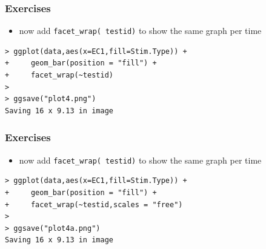 \documentclass[xcolor={table},c]{beamer}
\begin{document}
\begin{frame}[fragile]\frametitle{Exercises}
  \begin{itemize}
  \item now add \texttt{facet\_wrap(~testid)} to show the same graph per time
  \end{itemize}
\begin{verbatim}
> ggplot(data,aes(x=EC1,fill=Stim.Type)) +
+     geom_bar(position = "fill") +
+     facet_wrap(~testid)
> 
> ggsave("plot4.png")
Saving 16 x 9.13 in image
\end{verbatim}
\begin{center}
\end{center}
\end{frame}


\begin{frame}[fragile]\frametitle{Exercises}
  \begin{itemize}
  \item now add \texttt{facet\_wrap(~testid)} to show the same graph per time
  \end{itemize}
\begin{verbatim}
> ggplot(data,aes(x=EC1,fill=Stim.Type)) +
+     geom_bar(position = "fill") +
+     facet_wrap(~testid,scales = "free")
> 
> ggsave("plot4a.png")
Saving 16 x 9.13 in image
\end{verbatim}
\begin{center}
\end{center}
\end{frame}
\end{document}
